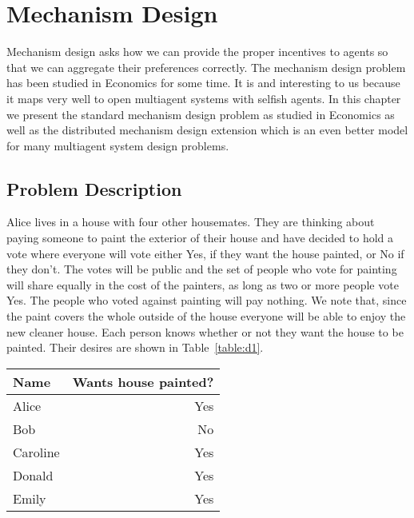 \section{Mechanism Design}
\label{sec:mechanism-design}


Mechanism design asks how we can provide the proper incentives to
agents so that we can aggregate their preferences correctly. The
mechanism design problem has been studied in Economics for some time.
It is and interesting to us because it maps very well to open
multiagent systems with selfish agents. In this chapter we present the
standard mechanism design problem as studied in Economics as well as
the distributed mechanism design extension which is an even better
model for many multiagent system design problems.

\subsection{Problem Description}

Alice lives in a house with four other housemates. They are thinking
about paying someone to paint the exterior of their house and have
decided to hold a vote where everyone will vote either Yes, if they
want the house painted, or No if they don't. The votes will be public
and the set of people who vote for painting will share equally in the
cost of the painters, as long as two or more people vote Yes.  The
people who voted against painting will pay nothing.  We note that,
since the paint covers the whole outside of the house everyone will be
able to enjoy the new cleaner house. Each person knows whether or not
they want the house to be painted. Their desires are shown in
Table~\ref{table:d1}.

\begin{SCtable}
  \begin{minipage}{1.0\linewidth}
    \begin{center}
      \begin{tabular}{lr} \toprule
        Name & Wants house painted? \\ \midrule
        Alice & Yes \\ 
        Bob & No \\ 
        Caroline & Yes \\ 
        Donald & Yes \\ 
        Emily & Yes \\ \bottomrule
      \end{tabular}
    \end{center}
  \end{minipage}
  \caption{List of individual desires for painting the house.}
  \label{table:d1}
\end{SCtable}

